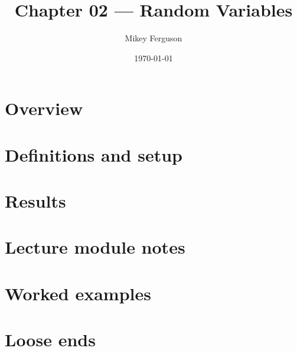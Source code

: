 \documentclass[11pt]{article}
\title{Chapter 02 --- Random Variables}
\author{Mikey Ferguson}
\date{\today}
\begin{document}
\maketitle
\tableofcontents
\bigskip

\section{Overview}

\section{Definitions and setup}

\section{Results}

\section{Lecture module notes}

\section{Worked examples}

\section{Loose ends}
\end{document}

